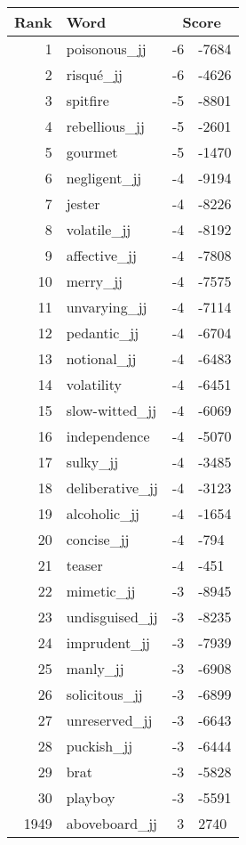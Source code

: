 \begin{longtable}[!htbp]{| rlr@{.}l |}
    \hline
    \textbf{Rank} & \textbf{Word} & \multicolumn{2}{c|}{\textbf{Score}} \\
    \hline
    \endhead
    1 & poisonous\_jj & -6 & -7684 \\
    2 & risqué\_jj & -6 & -4626 \\
    3 & spitfire & -5 & -8801 \\
    4 & rebellious\_jj & -5 & -2601 \\
    5 & gourmet & -5 & -1470 \\
    6 & negligent\_jj & -4 & -9194 \\
    7 & jester & -4 & -8226 \\
    8 & volatile\_jj & -4 & -8192 \\
    9 & affective\_jj & -4 & -7808 \\
    10 & merry\_jj & -4 & -7575 \\
    11 & unvarying\_jj & -4 & -7114 \\
    12 & pedantic\_jj & -4 & -6704 \\
    13 & notional\_jj & -4 & -6483 \\
    14 & volatility & -4 & -6451 \\
    15 & slow-witted\_jj & -4 & -6069 \\
    16 & independence & -4 & -5070 \\
    17 & sulky\_jj & -4 & -3485 \\
    18 & deliberative\_jj & -4 & -3123 \\
    19 & alcoholic\_jj & -4 & -1654 \\
    20 & concise\_jj & -4 & -794 \\
    21 & teaser & -4 & -451 \\
    22 & mimetic\_jj & -3 & -8945 \\
    23 & undisguised\_jj & -3 & -8235 \\
    24 & imprudent\_jj & -3 & -7939 \\
    25 & manly\_jj & -3 & -6908 \\
    26 & solicitous\_jj & -3 & -6899 \\
    27 & unreserved\_jj & -3 & -6643 \\
    28 & puckish\_jj & -3 & -6444 \\
    29 & brat & -3 & -5828 \\
    30 & playboy & -3 & -5591 \\
    1949 & aboveboard\_jj & 3 & 2740 \\

\end{longtable}
